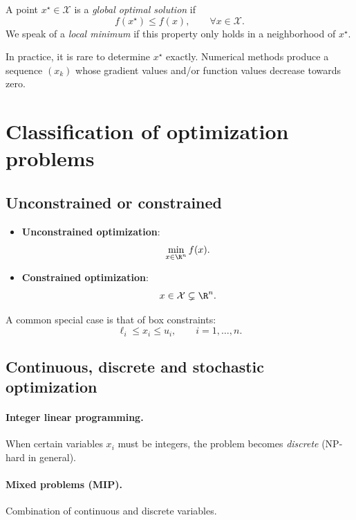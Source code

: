 \begin{definition}
A point $x^\star \in \mathcal{X}$ is a \emph{global optimal solution} if
\[
f(x^\star) \le f(x), \qquad \forall x \in \mathcal{X}.
\]
We speak of a \emph{local minimum} if this property only holds in a neighborhood of $x^\star$.
\end{definition}

\begin{remarque}
In practice, it is rare to determine $x^\star$ exactly.
Numerical methods produce a sequence $(x_k)$ whose gradient values
and/or function values decrease towards zero.
\end{remarque}

\section{Classification of optimization problems}

\subsection{Unconstrained or constrained}

\begin{itemize}
  \item \textbf{Unconstrained optimization}:  
  \[
  \min_{x\in\R^n} f(x).
  \]

  \item \textbf{Constrained optimization}:  
  \[
  x \in \mathcal{X} \subsetneq \R^n.
  \]
\end{itemize}

A common special case is that of box constraints:
\[
\ell_i \le x_i \le u_i, \qquad i=1,\dots,n.
\]

\subsection{Continuous, discrete and stochastic optimization}

\paragraph{Integer linear programming.}
When certain variables $x_i$ must be integers, the problem becomes
\emph{discrete} (NP-hard in general).

\paragraph{Mixed problems (MIP).}
Combination of continuous and discrete variables.

